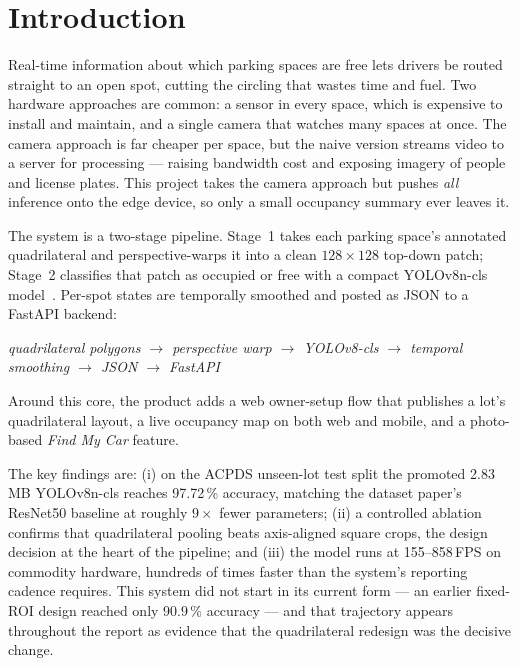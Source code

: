 \documentclass[10pt,twocolumn,letterpaper]{article}
\begin{document}
\section{Introduction}

Real-time information about which parking spaces are free lets drivers be
routed straight to an open spot, cutting the circling that wastes time and
fuel. Two hardware approaches are common: a sensor in every space, which is
expensive to install and maintain, and a single camera that watches many
spaces at once. The camera approach is far cheaper per space, but the naive
version streams video to a server for processing --- raising bandwidth cost
and exposing imagery of people and license plates. This project takes the
camera approach but pushes \emph{all} inference onto the edge device, so
only a small occupancy summary ever leaves it.

The system is a two-stage pipeline. Stage~1 takes each parking space's
annotated quadrilateral and perspective-warps it into a clean
$128\times128$ top-down patch; Stage~2 classifies that patch as occupied or
free with a compact YOLOv8n-cls model~\cite{ultralytics_yolov8}. Per-spot
states are temporally smoothed and posted as JSON to a FastAPI backend:

\begin{center}
\emph{quadrilateral polygons $\rightarrow$ perspective warp $\rightarrow$
YOLOv8-cls $\rightarrow$ temporal smoothing $\rightarrow$ JSON
$\rightarrow$ FastAPI}
\end{center}

Around this core, the product adds a web owner-setup flow that publishes a
lot's quadrilateral layout, a live occupancy map on both web and mobile,
and a photo-based \emph{Find My Car} feature.

The key findings are: (i) on the ACPDS unseen-lot test split the promoted
2.83\,MB YOLOv8n-cls reaches 97.72\,\% accuracy, matching the dataset
paper's ResNet50 baseline at roughly $9\times$ fewer parameters; (ii) a
controlled ablation confirms that quadrilateral pooling beats axis-aligned
square crops, the design decision at the heart of the pipeline; and (iii)
the model runs at 155--858\,FPS on commodity hardware, hundreds of times
faster than the system's reporting cadence requires. This system did not
start in its current form --- an earlier fixed-ROI design reached only
90.9\,\% accuracy --- and that trajectory appears throughout the report as
evidence that the quadrilateral redesign was the decisive change.
\end{document}
